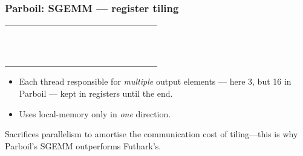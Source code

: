 \documentclass[rgb,dvipsnames]{beamer}
\begin{document}
\begin{frame}
  \frametitle{Parboil: SGEMM --- register tiling}

  \begin{minipage}{0.49\linewidth}
  \begin{tabular}{|c|c|c|c|c|c|c|c|c|c|c|c|c|c|c|c|c|c|}
    \hline
    &&&\SGt{}&\SGt{}&\SGt{}&&&&&&\\\hline
    &&&\SGt{}&\SGt{}&\SGt{}&&&&&&\\\hline
    &&&\SGt{}&\SGt{}&\SGt{}&&&&&&\\\hline
    &&&&&&&&&&&\\\hline
    &&&&&&&&&&&\\\hline
    &&&&&&&&&&&\\\hline
    &&&&&&&&&&&\\\hline
    &&\SGt{}&\SGthI{}&\SGthI{}&\SGthI{}&&&&&&\\\hline
    &&\SGt{}&\SGthII{}&\SGthII{}&\SGthII{}&&&&&&\\\hline
    &&\SGt{}&\SGthIII{}&\SGthIII{}&\SGthIII{}&&&&&&\\\hline
    &&&&&&&&&&&\\\hline
    &&&&&&&&&&&\\\hline
    &&&&&&&&&&&\\\hline
    &&&&&&&&&&&\\\hline
  \end{tabular}
  \end{minipage}
  \begin{minipage}{0.49\linewidth}
    \begin{itemize}
    \item Each thread responsible for \textit{multiple} output
      elements --- here 3, but 16 in Parboil --- kept in registers
      until the end.
    \item Uses local-memory only in \textit{one} direction.
    \end{itemize}
  \end{minipage}

  \pause \bigskip Sacrifices parallelism to amortise the communication
  cost of tiling---this is why Parboil's SGEMM outperforms Futhark's.
\end{frame}
\end{document}
